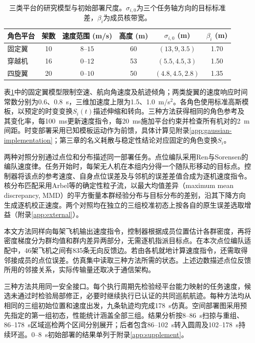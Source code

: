 \documentclass[UTF8,a4paper,11pt,fontset=none]{ctexart}
\begin{document}
\begin{table}[htbp]\centering\small
\caption{三类平台的研究模型与初始部署尺度。$\sigma_{i,0}$为三个任务轴方向的目标标准差，$\beta_i$为成员核带宽。}\label{tab:platforms}
\begin{tabular}{lccccc}\toprule
角色平台 & 架数 & 速度范围 (m/s) & 高度 (m) & $\sigma_{i,0}$ (m) & $\beta_i$ (m)\\\midrule
固定翼 & 10 & $8$--$15$ & 60 & $(13,9,3.5)$ & 1.70\\
穿越机 & 16 & $0$--$12$ & 53 & $(5.5,4.5,3)$ & 1.50\\
四旋翼 & 20 & $0$--$10$ & 50 & $(4.8,4.5,2.8)$ & 1.35\\\bottomrule
\end{tabular}\end{table}

表\ref{tab:platforms}中的固定翼模型限制空速、航向角速度及航迹倾角；两类旋翼的速度响应时间常数分别为0.6、0.8~s，三维加速度上限为1.5、1.0~m/s$^2$。各角色使用标准高斯模板，以预定的时变变换$S_i(t)$描述伸缩和转向。三种方法获得相同的角色参考及其变化率，每100~ms更新速度指令，每20~ms施加平台约束并检查所有机对的2~m间距。时变部署采用已知模板运动作为前馈，具体计算见附录\ref{app:gaussian-implementation}；第三章的名义耗散与稳定性结论对应固定的角色变换$S_i$。

两种对照分别通过点位和分布描述同一部署任务。点位编队采用Ren与Sorensen的编队速度律\cite{ren2008}。任务开始时，每架无人机在本组内分得一个随队形移动的目标点。控制器将该点的参考速度、自身点位误差及与邻机的误差差值合成为逐机速度指令。核分布匹配采用Arbel等的确定性粒子流\cite{arbel2019}，以最大均值差异（maximum mean discrepancy, MMD）的平方衡量本群经验分布与目标分布的差别，沿其下降方向生成逐机校正速度。两个对照均在独立的三组校准初态上按各自的原生误差选取增益（附录\ref{app:external}）。

本文方法同样向每架飞机输出速度指令，控制器根据成员位置估计各群密度，再将密度梯度分为群均值和群内差异两部分，无需逐机指派目标点。在本次点位编队适配中，46架飞机之间有835条无向反馈边。若由各机就地计算速度指令，还需取得邻接成员的点位误差。仿真集中读取三种方法所需的状态。上述边数描述点位反馈所用的邻接关系，实际传输量还取决于通信架构。

三种方法共用同一安全接口。每个执行周期先检验经平台能力映射的任务速度，候选未通过时检验局部修正，必要时继续执行已认证的共同巡航航迹。每种方法均从相同的三组初始位置和速度出发，九条轨迹均完成178~s仿真。空间部署图采用预先指定的第一组初态，性能统计涵盖全部三组。结果分析按8--86~s扫掠与重组、86--178~s区域巡检两个区间分别展开；后者包含86--102~s转入圆周及102--178~s持续环巡。0--8~s初始部署的结果单列于附录\ref{app:supplement}。
\end{document}
